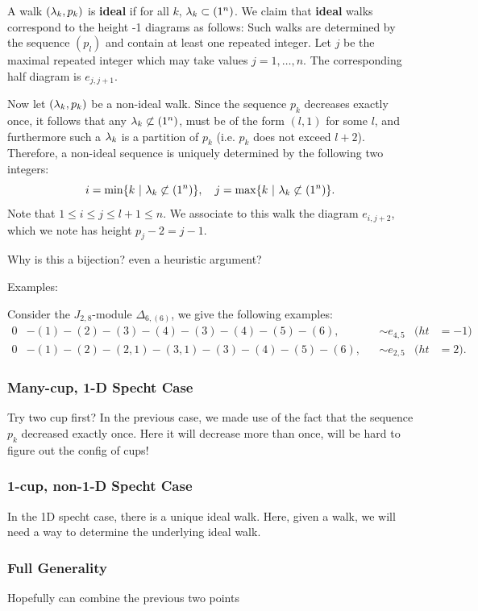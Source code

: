 A walk $(\lambda_k, p_k)$ is \textbf{ideal} if for all $k$, $\lambda_k \subset (1^n)$. We claim that \textbf{ideal} walks correspond to the height -1 diagrams as follows: Such walks are determined by the sequence $(p_l)$ and contain at least one repeated integer. Let $j$ be the maximal repeated integer which may take values $j=1,\dots, n$. The corresponding half diagram is $e_{j,j+1}$.

Now let $(\lambda_k,p_k)$ be a non-ideal walk. Since the sequence $p_k$ decreases exactly once, it follows that any $\lambda_k\not\subset (1^n)$, must be of the form $(l,1)$ for some $l$, and furthermore such a $\lambda_k$ is a partition of $p_k$ (i.e. $p_k$ does not exceed $l+2$). Therefore, a non-ideal sequence is uniquely determined by the following two integers:
\[i=\min\{k \ | \ \l_k\not\subset (1^n)\}, \quad j=\max\{k \ | \ \l_k\not\subset (1^n)\}.\]
Note that $1\leq i \leq j \leq l+1\leq n$. We associate to this walk the diagram $e_{i,j+2}$, which we note has height $p_j-2=j-1$.

Why is this a bijection? even a heuristic argument? 

Examples:

Consider the $J_{2,8}$-module $\Delta_{6,(6)}$, we give the following examples:
\begin{align*}
    0&-(1)-(2)-(3)-(4)-(3)-(4)-(5)-(6), &&\sim e_{4,5} &(ht&=-1)\\
        0&-(1)-(2)-(2,1)-(3,1)-(3)-(4)-(5)-(6), &&\sim e_{2,5} &(ht&=2).\end{align*}


\subsubsection{Many-cup, 1-D Specht Case}

Try two cup first? In the previous case, we made use of the fact that the sequence $p_k$ decreased exactly once. Here it will decrease more than once, will be hard to figure out the config of cups! 

\subsubsection{1-cup, non-1-D Specht Case}

In the 1D specht case, there is a unique ideal walk. Here, given a walk, we will need a way to determine the underlying ideal walk.

\subsubsection{Full Generality}
Hopefully can combine the previous two points

